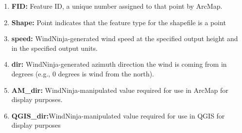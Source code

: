 \documentclass[12pt]{article}
\begin{document}
\begin{enumerate}[label=(\alph*)]
\item \textbf{FID:} Feature ID, a unique number assigned to that point by ArcMap.
\item \textbf{Shape:} Point indicates that the feature type for the shapefile is a point
\item \textbf{speed:} WindNinja-generated wind speed at the specified output height and in the specified output units.
\item \textbf{dir:} WindNinja-generated azimuth direction the wind is coming from in degrees (e.g., 0 degrees is wind from
the north).
\item \textbf{AM\_dir:} WindNinja-manipulated value required for use in ArcMap for display purposes.
\item \textbf{QGIS\_dir:}WindNinja-manipulated value required for use in QGIS for display purposes
\end{enumerate}
\end{document}
